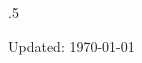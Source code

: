 \documentclass[margin]{res} %
\begin{document}
\begin{resume}
\vfill
\moveleft.5\hoffset\centerline{Updated: \today}

%
%


\end{resume}
\end{document}
